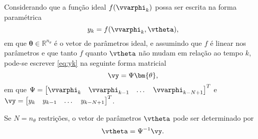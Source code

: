 Considerando que a função ideal $f(\vvarphi_{k})$ possa ser escrita na forma paramétrica 
\begin{equation}
    y_k = f(\vvarphi_{k},\vtheta),
   \label{eq:yk}
\end{equation}
em que $\bm{\theta} \in \mathbb{R}^{n_\theta}$  é o vetor de parâmetros ideal, 
%
e assumindo que $f$ é linear nos parâmetros e que tanto $f$ quanto $\vtheta$ não mudam em relação ao tempo $k$, pode-se escrever \eqref{eq:yk} na seguinte forma matricial
\begin{equation}
\label{eq:yMatrix}
   \vy = \Psi\bm{\theta},
\end{equation}
em que $\Psi = \begin{bmatrix} \vvarphi_{k} & \vvarphi_{k-1} & \dots & \vvarphi_ {k-N+1} \end{bmatrix}^T$ e $\vy = \begin{bmatrix} y_k & y_{k-1} & \dots & y_{k-N+1} \end{bmatrix}^T$.


Se $N=n_\theta$ restrições, o vetor de parâmetros $\vtheta$ pode ser determinado por
\begin{equation}
   \vtheta = \Psi^{-1}\vy
\label{eq:thetaest}.
\end{equation}

